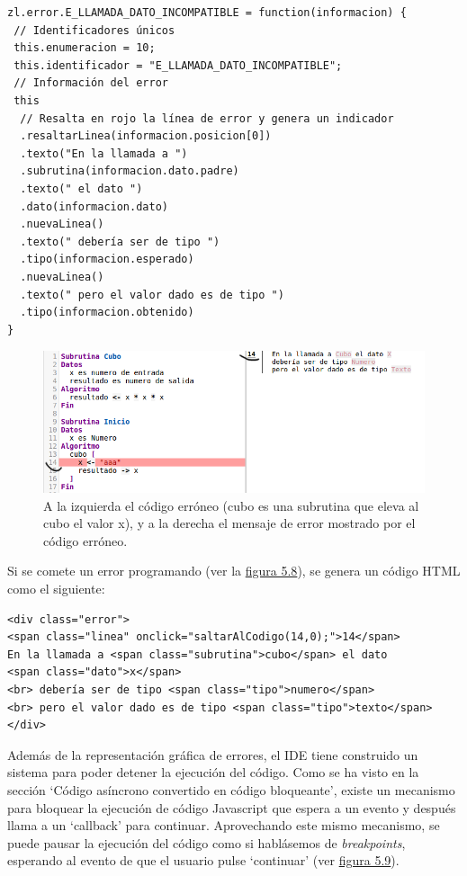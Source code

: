 \documentclass{report}
\begin{document}
	\begin{BVerbatim}
zl.error.E_LLAMADA_DATO_INCOMPATIBLE = function(informacion) {
 // Identificadores únicos
 this.enumeracion = 10; 
 this.identificador = "E_LLAMADA_DATO_INCOMPATIBLE"; 
 // Información del error
 this
  // Resalta en rojo la línea de error y genera un indicador
  .resaltarLinea(informacion.posicion[0]) 
  .texto("En la llamada a ")
  .subrutina(informacion.dato.padre)
  .texto(" el dato ")
  .dato(informacion.dato)
  .nuevaLinea()
  .texto(" debería ser de tipo ")
  .tipo(informacion.esperado)
  .nuevaLinea()
  .texto(" pero el valor dado es de tipo ")
  .tipo(informacion.obtenido)
}
	\end{BVerbatim}
	
	\begin{figure}
		\centering
		\includegraphics[width=1\linewidth]{error}
		\caption[Ejemplo de código erróneo y mensaje de error.]{A la izquierda el código erróneo (cubo es una subrutina que eleva al cubo el valor x), y a la derecha el mensaje de error mostrado por el código erróneo.}
		\label{fig:error}
	\end{figure}
	
	Si se comete un error programando (ver la \hyperref[fig:error]{figura 5.8}), se genera un código HTML como el siguiente:
	
	\vspace{10px}
	
	\begin{BVerbatim}
<div class="error">
<span class="linea" onclick="saltarAlCodigo(14,0);">14</span>
En la llamada a <span class="subrutina">cubo</span> el dato 
<span class="dato">x</span>
<br> debería ser de tipo <span class="tipo">numero</span>
<br> pero el valor dado es de tipo <span class="tipo">texto</span>
</div>
	\end{BVerbatim}
	
	\vspace{10px}
	
	Además de la representación gráfica de errores, el IDE tiene construido un sistema para poder detener la ejecución del código. Como se ha visto en la sección  `Código asíncrono convertido en código bloqueante', existe un mecanismo para bloquear la ejecución de código Javascript que espera a un evento y después llama a un `callback' para continuar. Aprovechando este mismo mecanismo, se puede pausar la ejecución del código como si hablásemos de \textit{breakpoints}\cite{breakpoint}, esperando al evento de que el usuario pulse `continuar' (ver \hyperref[fig:pausa1]{figura 5.9}).
	
\end{document}
